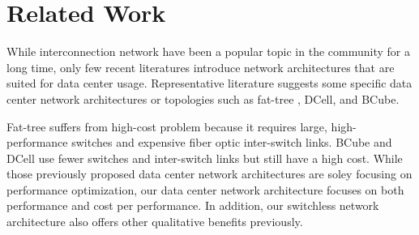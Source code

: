 \vspace{-0.1in}
\section{Related Work}
\label{sec:related}

While interconnection network have been a popular topic in the community for a long time\cite{datacenter3}, only few recent literatures introduce network architectures that are suited for data center usage. Representative literature suggests some specific data center network architectures or topologies such as fat-tree \cite{Al-Fares:2008:SCD, datacenter4}, DCell\cite{datacenter2}, and BCube\cite{datacenter5}. 

Fat-tree suffers from high-cost problem because it requires large, high-performance switches and expensive fiber optic inter-switch links. BCube and DCell use fewer switches and inter-switch links but still have a high cost. While those previously proposed data center network architectures are soley focusing on performance optimization, our data center network architecture focuses on both performance and cost per performance. In addition, our switchless network architecture also offers other qualitative benefits previously.
